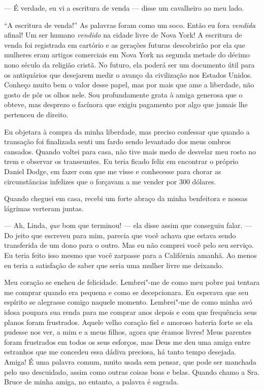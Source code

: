 --- É verdade, eu vi a escritura de venda --- disse um cavalheiro ao meu
lado.

``A escritura de venda!'' As palavras foram como um soco. Então eu fora
\emph{vendida} afinal! Um ser humano \emph{vendido} na cidade livre de
Nova York! A escritura de venda foi registrada em cartório e as gerações
futuras descobrirão por ela que mulheres eram artigos comerciais em Nova
York na segunda metade do décimo nono século da religião cristã. No
futuro, ela poderá ser um documento útil para os antiquários que
desejarem medir o avanço da civilização nos Estados Unidos. Conheço
muito bem o valor desse papel, mas por mais que ame a liberdade, não
gosto de pôr os olhos nele. Sou profundamente grata à amiga generosa que
o obteve, mas desprezo o facínora que exigiu pagamento por algo que
jamais lhe pertenceu de direito.

Eu objetara à compra da minha
liberdade, mas preciso confessar que quando a transação foi finalizada
senti um fardo sendo levantado dos meus ombros cansados. Quando voltei
para casa, não tive mais medo de desvelar meu rosto no trem e observar
os transeuntes. Eu teria ficado feliz em encontrar o próprio Daniel
Dodge, em fazer com que me visse e conhecesse para chorar as
circunstâncias infelizes que o forçavam a me vender por 300 dólares.

Quando cheguei em casa, recebi um forte
abraço da minha benfeitora e nossas lágrimas verteram juntas.

--- Ah, Linda, \emph{que} bom que terminou! --- ela disse assim que
conseguiu falar. --- Do jeito que escreveu para mim, parecia que você
achava que estava sendo transferida de um dono para o outro. Mas eu não
comprei você pelo seu serviço. Eu teria feito isso mesmo que você
zarpasse para a Califórnia amanhã. Ao menos eu teria a satisfação de
saber que seria uma mulher livre me deixando.

Meu coração se encheu de felicidade.
Lembrei"-me de como meu pobre pai tentara me comprar quando era pequena e
como se decepcionara. Eu esperava que seu espírito se alegrasse comigo
naquele momento. Lembrei"-me de como minha avó idosa poupara sua renda
para me comprar anos depois e com que frequência seus planos foram
frustrados. Aquele velho coração fiel e amoroso bateria forte se ela
pudesse nos ver, a mim e a meus filhos, agora que éramos livres! Meus
parentes foram frustrados em todos os seus esforços, mas Deus me deu uma
amiga entre estranhos que me concedeu essa dádiva preciosa, há tanto
tempo desejada. Amiga! É uma palavra comum, muito usada sem pensar, que
pode ser manchada pelo uso descuidado, assim como outras coisas boas e
belas. Quando chamo a Sra. Bruce de minha amiga, no entanto, a palavra é
sagrada.

